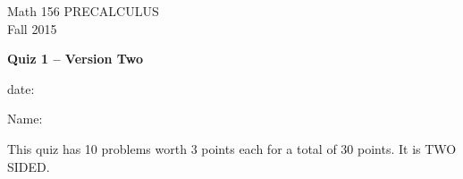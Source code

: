 \documentclass[11pt]{article}
\begin{document}
\begin{center}
\vspace{2in}

\huge{Math 156 PRECALCULUS \\
Fall 2015}

\vfill

\huge{\bf{Quiz 1 -- Version Two}}\\

\vspace{0.5in}

\large{date: \underline{\hspace{1in}}}\\

\vfill

{\huge{Name:{\underline{\hspace{2in}}}}}

\vfill
This quiz has 10 problems worth 3 points each for a total of 30 points. It is TWO SIDED. 
\vfill
\end{center}
\newpage
\restoregeometry
\end{document}
